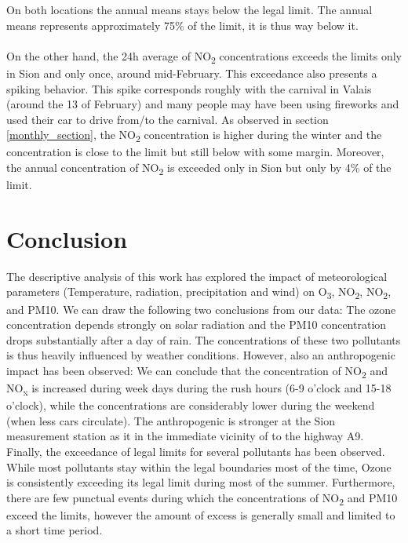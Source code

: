 \documentclass[a4paper, 12pt]{article}
\begin{document}
    On both locations the annual means stays below the legal limit. The annual means represents approximately 75\% of the limit, it is thus way below it. 
    \\
    \\
     On the other hand, the 24h average of NO\textsubscript{2} concentrations exceeds the limits only in Sion and only once, around mid-February. This exceedance also presents a spiking behavior. This spike corresponds roughly with the carnival in Valais (around the 13 of February) and many people may have been using fireworks and used their car to drive from/to the carnival. As observed in section \ref{monthly_section}, the NO\textsubscript{2} concentration is higher during the winter and the concentration is close to the limit but still below with some margin. Moreover, the annual concentration of NO\textsubscript{2} is exceeded only in Sion but only by 4\% of the limit. 
    
\section{Conclusion}
    The descriptive analysis of this work has explored the impact of meteorological parameters (Temperature, radiation, precipitation and wind) on O\textsubscript{3}, NO\textsubscript{2}, NO\textsubscript{2}, and PM10. We can draw the following two conclusions from our data: The ozone concentration depends strongly on solar radiation and the PM10 concentration drops substantially after a day of rain. The concentrations of these two pollutants is thus heavily influenced by weather conditions. However, also an anthropogenic impact has been observed: We can conclude that the concentration of NO\textsubscript{2} and NO\textsubscript{x} is increased during week days during the rush hours (6-9 o'clock and 15-18 o'clock), while the concentrations are considerably lower during the weekend (when less cars circulate). The anthropogenic is stronger at the Sion measurement station as it in the immediate vicinity of to the highway A9. Finally, the exceedance of legal limits for several pollutants has been observed. While most pollutants stay within the legal boundaries most of the time, Ozone is consistently exceeding its legal limit during most of the summer. Furthermore, there are few punctual events during which the concentrations of NO\textsubscript{2} and PM10 exceed the limits, however the amount of excess is generally small and limited to a short time period.

\newpage


\end{document}
